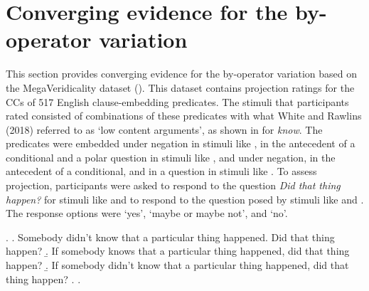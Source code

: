 \documentclass[a4paper,12pt,twoside]{article}
\newcommand{\posscite}[1]{\citeauthor{#1}'s (\citeyear{#1})}
\begin{document}
   
		\section{Converging evidence for the by-operator variation}\label{s:converging}

This section provides converging evidence for the by-operator variation based on the MegaVeridicality dataset (\citealt{white_role_2018}). This dataset contains projection ratings for the CCs of 517 English clause-embedding predicates. The stimuli that participants rated consisted of combinations of these predicates with what White and Rawlins (2018) referred to as ‘low content arguments’, as shown in \Next for \emph{know}. The predicates were embedded under negation in stimuli like \Next[a], in the antecedent of a conditional and a polar question in stimuli like \Next[b], and under negation, in the antecedent of a conditional, and in a question in stimuli like \Next[c]. To assess projection, participants were asked to respond to the question \emph{Did that thing happen?} for stimuli like \Next[a] and to respond to the question posed by stimuli like \Next[b] and \Next[c]. The response options were ‘yes’, ‘maybe or maybe not’, and ‘no’.


			\ex. \a. Somebody didn’t know that a particular thing happened. Did that thing happen?
				\b. If somebody knows that a particular thing happened, did that thing happen?
				\b. If somebody didn’t know that a particular thing happened, did that thing happen?
				\z.
			\z.
\end{document}
